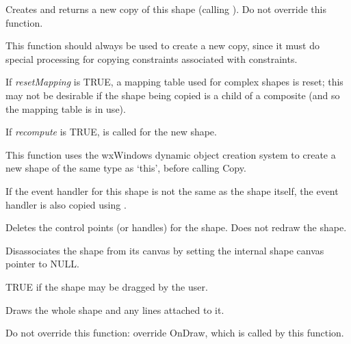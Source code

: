 \label{wxshapecreatenewcopy}


Creates and returns a new copy of this shape (calling ). Do not override this function.

This function should always be used to create a new copy, since it must do special processing
for copying constraints associated with constraints.

If {\it resetMapping} is TRUE, a mapping table used for complex shapes is reset; this may not be desirable
if the shape being copied is a child of a composite (and so the mapping table is in use).

If {\it recompute} is TRUE,  is called for the new shape.


This function uses the wxWindows dynamic object creation system to create a new shape of the same
type as `this', before calling Copy.

If the event handler for this shape is not the same as the shape itself, the event handler is also copied
using .



Deletes the control points (or handles) for the shape. Does not redraw
the shape.



Disassociates the shape from its canvas by setting the internal shape
canvas pointer to NULL.



TRUE if the shape may be dragged by the user.



Draws the whole shape and any lines attached to it.

Do not override this function: override OnDraw, which is called
by this function.

